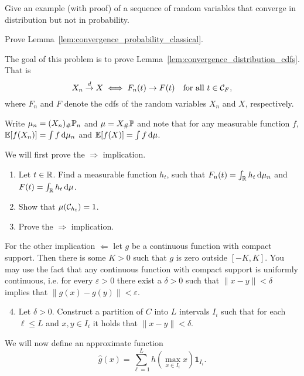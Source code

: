 \begin{problem}\label{prb:dlim_not_plim}
Give an example (with proof) of a sequence of random variables that converge in distribution but not in probability.
\end{problem}

\begin{problem}\label{prb:convergence_probability_classic}
Prove Lemma~\ref{lem:convergence_probability_classical}.
\end{problem}

\begin{problem}\label{prb:convergence_distribution}
The goal of this problem is to prove Lemma~\ref{lem:convergence_distribution_cdfs}. That is
\[
	X_n \stackrel{d}{\rightarrow} X \iff F_n(t) \to F(t) \quad \text{for all } t \in \mathcal C_F,
\]
where $F_n$ and $F$ denote the cdfs of the random variables $X_n$ and $X$, respectively.

Write $\mu_n = (X_n)_\# \mathbb P_n$ and $\mu = X_\# \mathbb P$ and note that for any measurable function $f$, $\mathbb E[f(X_n)] = \int f \, \mathrm{d} \mu_n$ and $\mathbb E[f(X)] = \int f \, \mathrm{d} \mu$.

We will first prove the $\Rightarrow$ implication. 
\begin{enumerate}[label={(\alph*)}]
\item Let $t \in \mathbb R$. Find a measurable function $h_t$, such that $F_n(t) = \int_{\mathbb R} h_t \, \mathrm{d} \mu_n$ and $F(t) = \int_{\mathbb R} h_t \, \mathrm{d} \mu$.
\item Show that $\mu(\mathcal C_{h_t}) = 1$.
\item Prove the $\Rightarrow$ implication. 
\end{enumerate}

For the other implication $\Leftarrow$ let $g$ be a continuous function with compact support. Then there is some $K > 0$ such that $g$ is zero outside $[-K,K]$. You may use the fact that any continuous function with compact support is uniformly continuous, i.e. for every $\varepsilon > 0$ there exist a $\delta > 0$ such that $\|x-y\| < \delta$ implies that $\|g(x) - g(y)\| < \varepsilon$. 
\begin{enumerate}[label={(\alph*)}]
\setcounter{enumi}{3}
\item Let $\delta > 0$. Construct a partition of $C$ into $L$ intervals $I_i$ such that for each $\ell \le L$ and $x, y \in I_i$ it holds that $\|x - y\| < \delta$.
\end{enumerate}

We will now define an approximate function
\[
	\hat{g}(x) = \sum_{\ell = 1}^L h(\max_{x \in I_i} x) \mathbf{1}_{I_i}.
\]


\end{problem}
